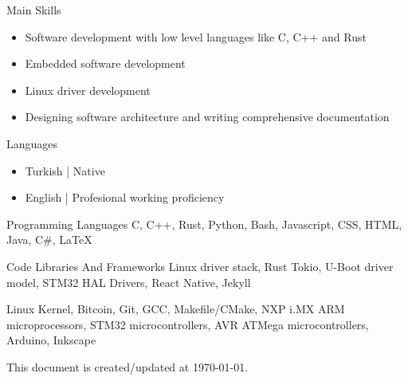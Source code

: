 \documentclass[10pt]{brutalist}
\begin{document}
\begin{multicols}{2}
\skillbox
{Main Skills}
{
\begin{itemize}
	\item Software development with low level languages like C, C++ and Rust
	\item Embedded software development
	\item Linux driver development
	\item Designing software architecture and writing comprehensive documentation
\end{itemize}
}

\skillbox
{Languages}
{
\begin{itemize}
	\item Turkish | Native
	\item English | Profesional working proficiency
\end{itemize}
}

\skillbox
{Programming Languages}
{C, C++, Rust, Python, Bash, Javascript, CSS, HTML, Java, C\#, \LaTeX}

\skillbox
{Code Libraries And Frameworks}
{Linux driver stack, Rust Tokio, U-Boot driver model, STM32 HAL Drivers, React Native, Jekyll}

{Linux Kernel, Bitcoin, Git, GCC, Makefile/CMake, NXP i.MX ARM microprocessors, STM32 microcontrollers, AVR ATMega microcontrollers, Arduino, Inkscape}
\end{multicols}

\vfill\null
\hfill\null\footnotesize This document is created/updated at \today.
\end{document}
